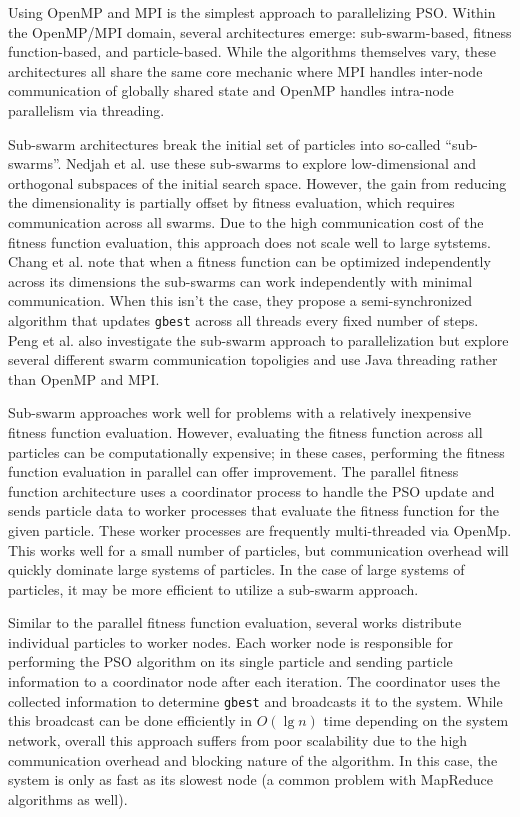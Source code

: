 Using OpenMP and MPI is the simplest approach to parallelizing PSO. Within the
OpenMP/MPI domain, several architectures emerge: sub-swarm-based, fitness
function-based, and particle-based. While the algorithms themselves vary, these
architectures all share the same core mechanic where MPI handles inter-node
communication of globally shared state and OpenMP handles intra-node parallelism
via threading.

Sub-swarm architectures break the initial set of particles into so-called
``sub-swarms''. Nedjah et al. \cite{comppso} use these sub-swarms to explore
low-dimensional and orthogonal subspaces of the initial search space. However,
the gain from reducing the dimensionality is partially offset by fitness
evaluation, which requires communication across all swarms. Due to the high
communication cost of the fitness function evaluation, this approach does not
scale well to large sytstems. Chang et al. \cite{ppso} note that when a fitness
function can be optimized independently across its dimensions the sub-swarms can
work independently with minimal communication. When this isn't the case, they
propose a semi-synchronized algorithm that updates \texttt{gbest} across all
threads every fixed number of steps. Peng et al. \cite{multicore-pso} also
investigate the sub-swarm approach to
parallelization but explore several different swarm communication topoligies and
use Java threading rather than OpenMP and MPI.

Sub-swarm approaches work well for problems with a relatively inexpensive
fitness function evaluation. However, evaluating the fitness function across all
particles can be computationally expensive; in these cases, performing the
fitness function evaluation in parallel can offer improvement. The parallel
fitness function architecture \cite{pgpso, ppso-fd} uses a coordinator process
to handle the PSO update and sends particle data to worker processes that
evaluate the fitness function for the given particle. These worker processes are
frequently multi-threaded via OpenMp.
This works well for a small number of particles, but communication
overhead will quickly dominate large systems of particles. In the case of large
systems of particles, it may be more efficient to utilize a sub-swarm approach.

Similar to the parallel fitness function evaluation, several works
\cite{cooppso, optionpso} distribute individual particles to worker nodes. Each
worker node is responsible for performing the PSO algorithm on its single
particle and sending particle information to a coordinator node after each
iteration. The coordinator uses the collected information to determine
\texttt{gbest} and broadcasts it to the system. While this broadcast can be done
efficiently in $O(\lg n)$ time depending on the system network, overall this
approach suffers from poor scalability due to the high communication overhead
and blocking nature of the algorithm. In this case, the system is only as fast
as its slowest node (a common problem with MapReduce algorithms as well).

